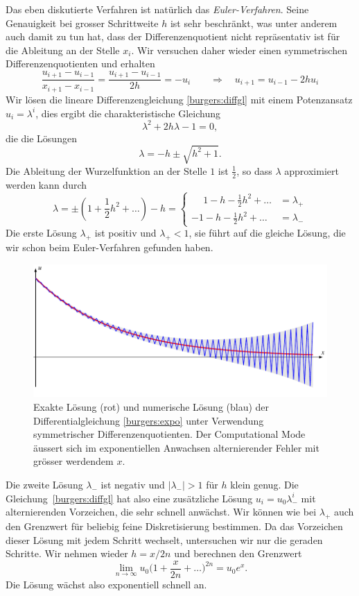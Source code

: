 Das eben diskutierte Verfahren ist natürlich das {\em Euler-Verfahren}.
Seine Genauigkeit bei grosser Schrittweite $h$ ist sehr beschränkt,
was unter anderem auch damit zu tun hat, dass der Differenzenquotient
nicht repräsentativ ist für die Ableitung an der Stelle $x_i$.
Wir versuchen daher wieder einen symmetrischen Differenzenquotienten
und erhalten
\begin{equation}
\frac{u_{i+1}-u_{i-1}}{x_{i+1}-x_{i-1}}
=
\frac{u_{i+1}-u_{i-1}}{2h}
=
-u_{i}
\qquad\Rightarrow\quad
u_{i+1}=u_{i-1}-2hu_{i}
\label{burgers:diffgl}
\end{equation}
Wir lösen die lineare Differenzengleichung \eqref{burgers:diffgl} mit einem
Potenzansatz $u_i=\lambda^i$, dies ergibt die charakteristische Gleichung
\[
\lambda^2+2h\lambda-1=0,
\]
die die Lösungen
\[
\lambda = -h\pm\sqrt{h^2+1}.
\]
Die Ableitung der Wurzelfunktion an der Stelle $1$ ist $\frac12$, so dass
$\lambda$ approximiert werden kann durch
\[
\lambda = \pm(1+\frac12h^2+\dots)- h
=
\begin{cases}
\phantom{-}1-h-\frac12h^2+\dots&=\lambda_+\\
-1-h-\frac12h^2+\dots&=\lambda_-
\end{cases}
\]
Die erste Lösung $\lambda_+$ ist positiv und $\lambda_+<1$, sie führt auf
die gleiche Lösung, die wir schon beim Euler-Verfahren gefunden haben.
\begin{figure}
\centering
\includegraphics{learning/compmod.pdf}
\caption{Exakte Lösung (rot) und numerische Lösung (blau)
der Differentialgleichung
\eqref{burgers:expo}
unter Verwendung symmetrischer Differenzenquotienten.
Der Computational Mode äussert sich im exponentiellen Anwachsen
alternierender Fehler mit grösser werdendem $x$.
\label{burgers:compmod}}
\end{figure}

Die zweite Lösung $\lambda_-$ ist negativ und $|\lambda_-|>1$ für $h$
klein genug.
Die Gleichung~\eqref{burgers:diffgl} hat also eine zusätzliche Lösung
$u_i=u_0\lambda_-^i$ mit alternierenden Vorzeichen, die sehr schnell anwächst.
Wir können wie bei $\lambda_+$ auch den Grenzwert für beliebig feine
Diskretisierung bestimmen.
Da das Vorzeichen dieser Lösung mit jedem Schritt wechselt, untersuchen
wir nur die geraden Schritte.
Wir nehmen wieder $h=x/2n$ und berechnen den Grenzwert
\[
\lim_{n\to\infty}
u_0
\biggl(
1+\frac{x}{2n}+\dots
\biggr)^{2n}
=
u_0e^x.
\]
Die Lösung wächst also exponentiell schnell an.

